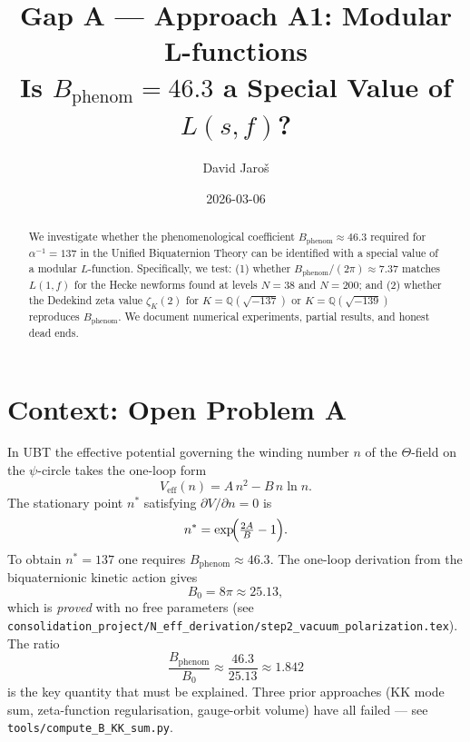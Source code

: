 \documentclass[12pt,a4paper]{article}
\title{\textbf{Gap A --- Approach A1: Modular L-functions}\\
         \large Is $B_{\mathrm{phenom}} = 46.3$ a Special Value of $L(s,f)$?}
\author{David Jaro\v{s}}
\date{2026-03-06}
\theoremstyle{definition}
\theoremstyle{remark}
\begin{document}
  \maketitle

  \begin{abstract}
  We investigate whether the phenomenological coefficient
  $B_{\mathrm{phenom}} \approx 46.3$ required for $\alpha^{-1} = 137$
  in the Unified Biquaternion Theory can be identified with a special value
  of a modular $L$-function.  Specifically, we test: (1) whether
  $B_{\mathrm{phenom}}/(2\pi) \approx 7.37$ matches $L(1,f)$ for the
  Hecke newforms found at levels $N = 38$ and $N = 200$; and (2) whether
  the Dedekind zeta value $\zeta_{K}(2)$ for $K = \mathbb{Q}(\sqrt{-137})$
  or $K = \mathbb{Q}(\sqrt{-139})$ reproduces $B_{\mathrm{phenom}}$.
  We document numerical experiments, partial results, and honest dead ends.
  \end{abstract}
\fi

\section{Context: Open Problem A}
\label{sec:context}

In UBT the effective potential governing the winding number $n$ of the
$\Theta$-field on the $\psi$-circle takes the one-loop form
\begin{equation}
  V_{\mathrm{eff}}(n) = A\,n^2 - B\,n\ln n.
\end{equation}
The stationary point $n^*$ satisfying $\partial V/\partial n = 0$ is
\begin{equation}
  n^* = \exp\!\Bigl(\tfrac{2A}{B} - 1\Bigr).
\end{equation}
To obtain $n^* = 137$ one requires $B_{\mathrm{phenom}} \approx 46.3$.
The one-loop derivation from the biquaternionic kinetic action gives
\begin{equation}
  B_0 = 8\pi \approx 25.13, \label{eq:B0}
\end{equation}
which is \emph{proved} with no free parameters (see
\texttt{consolidation\_project/N\_eff\_derivation/step2\_vacuum\_polarization.tex}).
The ratio
\begin{equation}
  \frac{B_{\mathrm{phenom}}}{B_0} \approx \frac{46.3}{25.13} \approx 1.842
\end{equation}
is the key quantity that must be explained.  Three prior approaches (KK mode
sum, zeta-function regularisation, gauge-orbit volume) have all failed
--- see \texttt{tools/compute\_B\_KK\_sum.py}.
\end{document}
